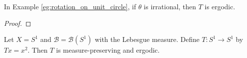     \begin{proposition}\label{prop:irrational_rotation_is_ergodic}
        In Example \ref{eg:rotation_on_unit_circle}, if \(\theta\) is irrational, then \(T\) is ergodic.
    \end{proposition}
    \begin{proof}
    \end{proof}

    \begin{example}
        Let \(X = S^1\) and \(\mathcal{B} = \mathcal{B}(S^1)\) with the Lebesgue measure.
        Define \(T:S^1 \to S^1\) by \(Tx = x^2\).
        Then \(T\) is measure-preserving and ergodic.
    \end{example}
